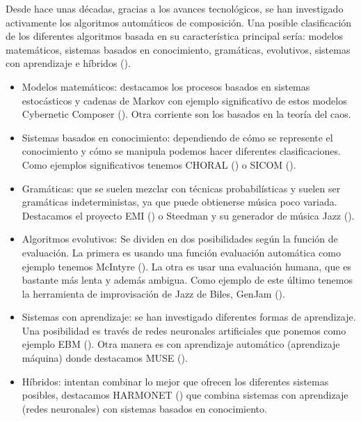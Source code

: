 Desde hace unas décadas, gracias a los avances tecnológicos, se han investigado activamente los algoritmos automáticos de composición. Una posible clasificación de los diferentes algoritmos basada en su característica principal sería: modelos matemáticos, sistemas basados en conocimiento, gramáticas, evolutivos, sistemas con aprendizaje e híbridos (\cite{AIMethodsForComposition}). \\
\color{blue} 
\begin{itemize}
	\item Modelos matemáticos: destacamos los procesos basados en sistemas estocásticos y cadenas de Markov con ejemplo significativo de estos modelos Cybernetic Composer (\cite{AIMusicSurvey}). Otra corriente son los basados en la teoría del caos.
	\item Sistemas basados en conocimiento: dependiendo de cómo se represente el conocimiento y cómo se manipula podemos hacer diferentes clasificaciones. Como ejemplos significativos tenemos CHORAL (\cite{HistoryAlgorithmicComp}) o SICOM (\cite{SICOM}).
	\item Gramáticas: que se suelen mezclar con técnicas probabilísticas y suelen ser gramáticas indeterministas, ya que puede obtienerse música poco variada. Destacamos el proyecto EMI (\cite{HistoryAlgorithmicComp}) o Steedman y su generador de música Jazz (\cite{AIMethodsForComposition}).
	\item Algoritmos evolutivos: Se dividen en dos posibilidades según la función de evaluación. La primera es usando una función evaluación automática como ejemplo tenemos McIntyre (\cite{AIMethodsForComposition}). La otra es usar una evaluación humana, que es bastante más lenta y además ambigua. Como ejemplo de este último tenemos la herramienta de improvisación de Jazz de Biles, GenJam (\cite{GenJam}).
	\item Sistemas con aprendizaje: se han investigado diferentes formas de aprendizaje. Una posibilidad es través de redes neuronales artificiales que ponemos como ejemplo EBM (\cite{AIMethodsForComposition}). Otra manera es con aprendizaje automático (aprendizaje máquina) donde destacamos MUSE (\cite{AIMethodsForComposition}).
	\item Híbridos: intentan combinar lo mejor que ofrecen los diferentes sistemas posibles, destacamos HARMONET (\cite{AIMethodsForComposition}) que combina sistemas con aprendizaje (redes neuronales) con sistemas basados en conocimiento.\\
\end{itemize}
\color{black}

